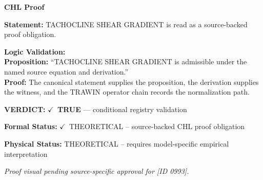 \vspace{0.45em}
\noindent\textbf{CHL Proof}\par
\textbf{Statement:} TACHOCLINE SHEAR GRADIENT is read as a source-backed proof obligation.

\textbf{Logic Validation:}\\
\textbf{Proposition:} ``TACHOCLINE SHEAR GRADIENT is admissible under the named source equation and derivation.''\\
\textbf{Proof:} The canonical statement supplies the proposition, the derivation supplies the witness, and the TRAWIN operator chain records the normalization path.

\textbf{VERDICT:} \ensuremath{\checkmark}\ \textbf{TRUE} --- conditional registry validation

\textbf{Formal Status:} \ensuremath{\checkmark}\ THEORETICAL -- source-backed CHL proof obligation

\textbf{Physical Status:} THEORETICAL -- requires model-specific empirical interpretation
\par\vspace{0.45em}
\par
\vfill
\begingroup\footnotesize\itshape
Proof visual pending source-specific approval for [ID 0993].
\par\endgroup
\vfill
\endgroup
\endgroup
